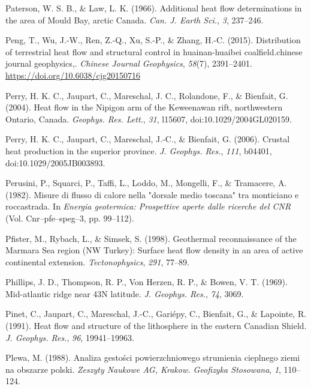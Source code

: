 \begin{CSLReferences}{1}{1}
\leavevmode{}%
Paterson, W. S. B., \& Law, L. K. (1966). Additional heat flow determinations in the area of {Mould Bay}, arctic {Canada}. \emph{Can. J. Earth Sci.}, \emph{3}, 237--246.

\leavevmode{}%
Peng, T., Wu, J.-W., Ren, Z.-Q., Xu, S.-P., \& Zhang, H.-C. (2015). Distribution of terrestrial heat flow and structural control in huainan-huaibei coalfield.chinese journal geophysics,. \emph{Chinese Journal Geophysics}, \emph{58}(7), 2391--2401. \url{https://doi.org/10.6038/cjg20150716}

\leavevmode{}%
Perry, H. K. C., Jaupart, C., Mareschal, J. C., Rolandone, F., \& Bienfait, G. (2004). Heat flow in the {Nipigon} arm of the {Keweenawan} rift, northwestern {Ontario, Canada}. \emph{Geophys. Res. Lett.}, \emph{31}, l15607, doi:10.1029/2004GL020159.

\leavevmode{}%
Perry, H. K. C., Jaupart, C., Mareschal, J.-C., \& Bienfait, G. (2006). Crustal heat production in the superior province. \emph{J. Geophys. Res.}, \emph{111}, b04401, doi:10.1029/2005JB003893.

\leavevmode{}%
Perusini, P., Squarci, P., Taffi, L., Loddo, M., Mongelli, F., \& Tramacere, A. (1982). Misure di flusso di calore nella "dorsale medio toscana" tra monticiano e roccastrada. In \emph{Energia geotermica: Prospettive aperte dalle ricerche del CNR} (Vol. Cnr--pfe--speg--3, pp. 99--112).

\leavevmode{}%
Pfister, M., Rybach, L., \& Simsek, S. (1998). Geothermal reconnaissance of the {Marmara Sea} region {(NW Turkey)}: Surface heat flow density in an area of active continental extension. \emph{Tectonophysics}, \emph{291}, 77--89.

\leavevmode{}%
Phillips, J. D., Thompson, R. P., Von Herzen, R. P., \& Bowen, V. T. (1969). Mid-atlantic ridge near 43N latitude. \emph{J. Geophys. Res.}, \emph{74}, 3069.

\leavevmode{}%
Pinet, C., Jaupart, C., Mareschal, J.-C., Gariépy, C., Bienfait, G., \& Lapointe, R. (1991). Heat flow and structure of the lithosphere in the eastern {Canadian Shield}. \emph{J. Geophys. Res.}, \emph{96}, 19941--19963.

\leavevmode{}%
Plewa, M. (1988). Analiza gestości powierzchniowego strumienia cieplnego ziemi na obszarze polski. \emph{Zeszyty Naukowe AG, Krakow. Geofizyka Stosowana}, \emph{1}, 110--124.


\end{CSLReferences}
